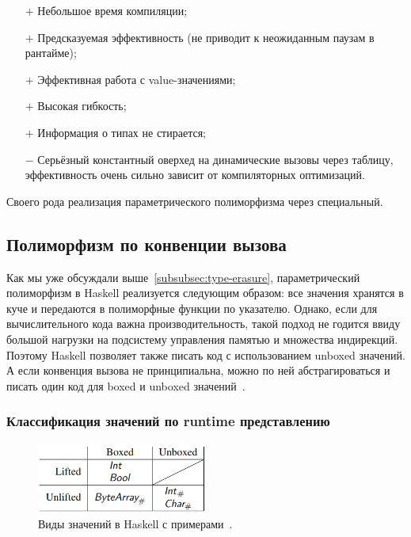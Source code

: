 \documentclass[12pt]{article}
\newcommand{\positive}{$+$} %
\newcommand{\negative}{{\color{red} $-$}} %
\begin{document}
    \begin{itemize}
        \item[\positive] Небольшое время компиляции;
        \item[\positive] Предсказуемая эффективность (не приводит к неожиданным паузам в рантайме);
        \item[\positive] Эффективная работа с value-значениями;
        \item[\positive] Высокая гибкость;
        \item[\positive] Информация о типах не стирается;
        \item[\negative] Серьёзный константный оверхед на динамические вызовы через таблицу, эффективность очень сильно зависит от компиляторных оптимизаций.
    \end{itemize}

    Своего рода реализация параметрического полиморфизма через специальный.

    \subsection{Полиморфизм по конвенции вызова} \label{subsec:representation-polymorphism}

    Как мы уже обсуждали выше~\ref{subsubsec:type-erasure}, параметрический полиморфизм в Haskell реализуется следующим образом: все значения хранятся в куче и передаются в полиморфные функции по указателю.
    Однако, если для вычислительного кода важна производительность, такой подход не годится ввиду большой нагрузки на подсистему управления памятью и множества индирекций.
    Поэтому Haskell позволяет также писать код с использованием unboxed значений.
    А если конвенция вызова не принципиальна, можно по ней абстрагироваться и писать один код для boxed и unboxed значений~\cite{eisenberg2017levity}.

    \subsubsection{Классификация значений по runtime представлению}

    \begin{figure}
        \centering
        \includegraphics[width=0.5\textwidth]{figs/haskell-value-kinds}
        \caption{Виды значений в Haskell с примерами~\cite{eisenberg2017levity}.}
        \label{fig:haskell-value-kinds}
    \end{figure}
\end{document}
